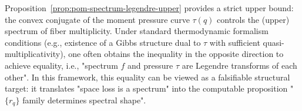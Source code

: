 \begin{remark}\label{rem:pom-spectrum-formalism}
Proposition~\ref{prop:pom-spectrum-legendre-upper} provides a strict upper bound: the convex conjugate of the moment pressure curve $\tau(q)$ controls the (upper) spectrum of fiber multiplicity.
Under standard thermodynamic formalism conditions (e.g., existence of a Gibbs structure dual to $\tau$ with sufficient quasi-multiplicativity), one often obtains the inequality in the opposite direction to achieve equality, i.e., "spectrum $f$ and pressure $\tau$ are Legendre transforms of each other".
In this framework, this equality can be viewed as a falsifiable structural target: it translates "space loss is a spectrum" into the computable proposition "$\{r_q\}$ family determines spectral shape".
\end{remark}

